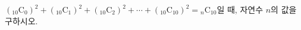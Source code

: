 $({}_{10}\mathrm{C}_0)^2+({}_{10}\mathrm{C}_1)^2+({}_{10}\mathrm{C}_2)^2+\cdots+({}_{10}\mathrm{C}_{10})^2={}_n\mathrm{C}_{10}$일 때, 자연수 $n$의 값을 구하시오.
